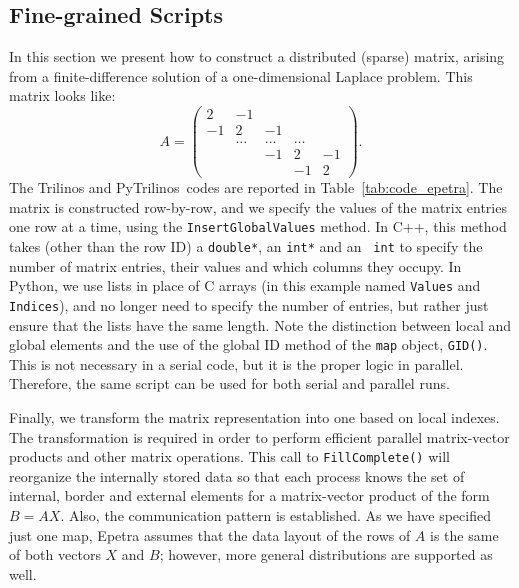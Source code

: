 \documentclass[acmtocl]{acmtrans2m}
\newcommand{\PyTrilinos}{{PyTrilinos}}
\begin{document}
\subsection{Fine-grained Scripts}
\label{sec:fine}

In this section we present how to construct a distributed (sparse)
matrix, arising from a finite-difference solution of a one-dimensional
Laplace problem.  This matrix looks like:
\begin{equation*}
  A = \begin{pmatrix}
     2 & -1     &        &        &    \\
    -1 &  2     & -1     &        &    \\
       & \ldots & \ldots & \ldots &    \\
       &        & -1     & 2      & -1 \\
       &        &        & -1     & 2
  \end{pmatrix}.
\end{equation*}
The Trilinos and \PyTrilinos\ codes are reported in
Table~\ref{tab:code_epetra}.  The matrix is constructed row-by-row,
and we specify the values of the matrix entries one row at a time,
using the {\tt InsertGlobalValues} method.  In C++, this method takes
(other than the row ID) a {\tt double*}, an {\tt int*} and an {\tt
  int} to specify the number of matrix entries, their values and which
columns they occupy.  In Python, we use lists in place of C arrays (in
this example named {\tt Values} and {\tt Indices}), and no longer need
to specify the number of entries, but rather just ensure that the
lists have the same length.  Note the distinction between local and
global elements and the use of the global ID method of the {\tt map}
object, {\tt GID()}.  This is not necessary in a serial code, but it
is the proper logic in parallel.  Therefore, the same script can be
used for both serial and parallel runs.

Finally, we transform the matrix representation into one based on
local indexes.  The transformation is required in order to perform
efficient parallel matrix-vector products and other matrix operations.
This call to {\tt FillComplete()} will reorganize the internally
stored data so that each process knows the set of internal, border and
external elements for a matrix-vector product of the form $B = AX$.
Also, the communication pattern is established.  As we have specified
just one map, Epetra assumes that the data layout of the rows of $A$ is the
same of both vectors $X$ and $B$; however, more general distributions
are supported as well.
\end{document}

